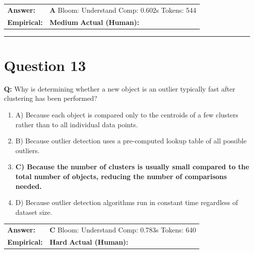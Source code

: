 \documentclass[9pt]{article}
\begin{document}
\begin{tabular}{@{}l p{10.5cm}@{}}
\textbf{Answer:} & \textbf{A} \hspace{1em} Bloom: Understand \hspace{1em} Comp: 0.602s \hspace{1em} Tokens: 544 \\
\textbf{Empirical:} & \textbf{Medium} \hspace{1em} \textbf{Actual (Human):} \underline{\hspace{5cm}}
\end{tabular}

\vspace{0.2cm}
\rule{\textwidth}{0.4pt}
\vspace{0.2cm}


\section*{Question 13}

\textbf{Q:} Why is determining whether a new object is an outlier typically fast after clustering has been performed?

\begin{enumerate}[label=\textbf{\alph{*})}, nosep]
    \item A) Because each object is compared only to the centroids of a few clusters rather than to all individual data points.
    \item B) Because outlier detection uses a pre‑computed lookup table of all possible outliers.
    \item \textbf{C) Because the number of clusters is usually small compared to the total number of objects, reducing the number of comparisons needed.} %
    \item D) Because outlier detection algorithms run in constant time regardless of dataset size.

\end{enumerate}

\begin{tabular}{@{}l p{10.5cm}@{}}
\textbf{Answer:} & \textbf{C} \hspace{1em} Bloom: Understand \hspace{1em} Comp: 0.783s \hspace{1em} Tokens: 640 \\
\textbf{Empirical:} & \textbf{Hard} \hspace{1em} \textbf{Actual (Human):} \underline{\hspace{5cm}}
\end{tabular}
\end{document}

